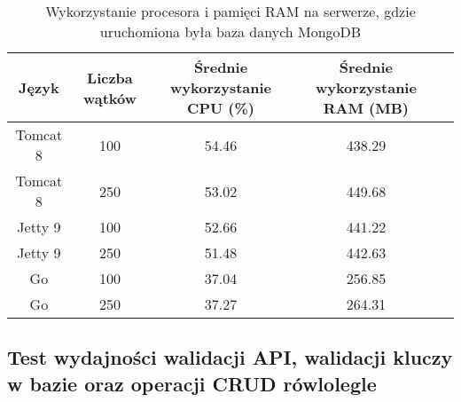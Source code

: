 \begin{table}[!htb]
\centering
\caption{Wykorzystanie procesora i pamięci RAM na serwerze, gdzie uruchomiona była baza danych MongoDB}
\label{tab:mongo-full-crud}
\begin{tabular}{@{}ccccl@{}}
\toprule
\textbf{Język} & \textbf{Liczba wątków} & \multicolumn{1}{p{3cm}}{\textbf{Średnie wykorzystanie CPU (\%)}} & \multicolumn{1}{p{3cm}}{\textbf{Średnie wykorzystanie RAM (MB)}} &  \\ \midrule
Tomcat 8       & 100                    & 54.46                             & 438.29                          &  \\
Tomcat 8       & 250                    & 53.02                             & 449.68                          &  \\
Jetty 9       & 100                    & 52.66                             & 441.22                          &  \\
Jetty 9       & 250                    & 51.48                             & 442.63                          &  \\
Go       & 100                    & 37.04                             & 256.85                          &  \\
Go       & 250                    & 37.27                             & 264.31                          &  \\
\bottomrule
\end{tabular}
\end{table}

 \newpage
 \subsection{Test wydajności walidacji API, walidacji kluczy w bazie oraz operacji CRUD rówlolegle }
% 
 \clearpage

